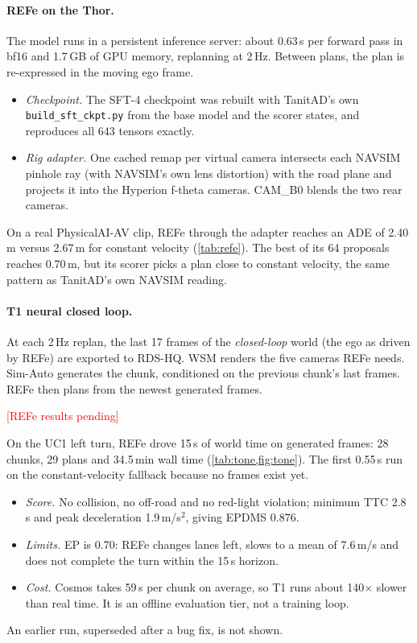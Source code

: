 \documentclass[10pt,a4paper]{article}
\newcommand{\todo}[1]{\textcolor{red}{[#1]}}
\providecommand{\ResultsRefe}{\todo{REFe results pending}}
\begin{document}
\paragraph{REFe on the Thor.} The model runs in a persistent inference server: about 0.63\,s per forward
pass in bf16 and 1.7\,GB of GPU memory, replanning at 2\,Hz. Between plans, the plan is re-expressed in the
moving ego frame.
\begin{itemize}[leftmargin=1.4em,itemsep=0pt]
\item \emph{Checkpoint.} The SFT-4 checkpoint was rebuilt with TanitAD's own \texttt{build\_sft\_ckpt.py}
  from the base model and the scorer states, and reproduces all 643 tensors exactly.
\item \emph{Rig adapter.} One cached remap per virtual camera intersects each NAVSIM pinhole ray (with
  NAVSIM's own lens distortion) with the road plane and projects it into the Hyperion f-theta cameras.
  CAM\_B0 blends the two rear cameras.
\end{itemize}
On a real PhysicalAI-AV clip, REFe through the adapter reaches an ADE of 2.40\,m versus 2.67\,m for constant
velocity (\cref{tab:refe}). The best of its 64 proposals reaches 0.70\,m, but its scorer picks a plan close
to constant velocity, the same pattern as TanitAD's own NAVSIM reading.

\paragraph{T1 neural closed loop.} At each 2\,Hz replan, the last 17 frames of the \emph{closed-loop} world
(the ego as driven by REFe) are exported to RDS-HQ. WSM renders the five cameras REFe needs. Sim-Auto
generates the chunk, conditioned on the previous chunk's last frames. REFe then plans from the newest
generated frames.

\ResultsRefe

On the UC1 left turn, REFe drove 15\,s of world time on generated frames: 28 chunks, 29 plans and 34.5\,min wall
time (\cref{tab:tone,fig:tone}). The first 0.55\,s run on the constant-velocity fallback because no frames exist yet.
\begin{itemize}[leftmargin=1.4em,itemsep=0pt]
\item \emph{Score.} No collision, no off-road and no red-light violation; minimum TTC 2.8\,s and peak deceleration
  1.9\,m/s$^2$, giving EPDMS 0.876.
\item \emph{Limits.} EP is 0.70: REFe changes lanes left, slows to a mean of 7.6\,m/s and does not complete the
  turn within the 15\,s horizon.
\item \emph{Cost.} Cosmos takes 59\,s per chunk on average, so T1 runs about 140$\times$ slower than real time. It
  is an offline evaluation tier, not a training loop.
\end{itemize}
An earlier run, superseded after a bug fix, is not shown.
\end{document}
